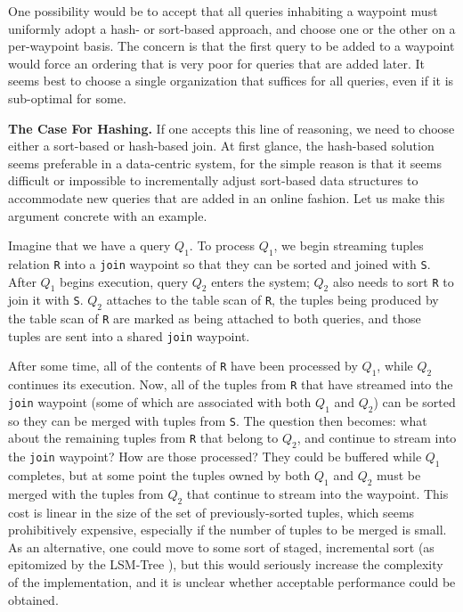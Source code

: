 \documentclass{sig-alternate}
\renewcommand\:{\colon} %
\begin{document}
One possibility would be to accept
that all queries inhabiting a waypoint must uniformly adopt a hash- or sort-based approach, and choose one or the other
on a per-waypoint basis.
The concern is that 
the first query to be added to a waypoint would force an ordering that is very poor for queries that 
are added later.  It seems best to choose a single organization that suffices for all queries, even if it is sub-optimal
for some.

\vspace{5 pt}
\noindent
\textbf{The Case For Hashing.}
If one accepts this line of reasoning, we need to choose either a sort-based or hash-based join. At
first glance, the hash-based solution seems 
preferable in a data-centric system, for the simple
reason is that it seems difficult or impossible to incrementally adjust sort-based data structures
to accommodate new queries that are added in an online fashion.
Let us make this argument concrete with an example.

Imagine that we have a query $Q_1$.  To process
$Q_1$, we begin streaming tuples relation \texttt{R} into a \texttt{join} waypoint so that they
can be sorted and 
joined with \texttt{S}.  After $Q_1$ begins execution,
query $Q_2$ enters the system; $Q_2$ also needs to sort \texttt{R} to join it with \texttt{S}.
$Q_2$ attaches to the table scan of \texttt{R}, the tuples being produced
by the table scan of \texttt{R} are marked as being attached to both queries, and those tuples are sent into a shared \texttt{join} waypoint.

After some time, all of the contents of \texttt{R} have been processed  
by $Q_1$, while $Q_2$ continues its execution.
Now, all of the tuples from \texttt{R} that have streamed into the \texttt{join} waypoint 
(some of which are associated with both $Q_1$ and $Q_2$) can be sorted
so they can be merged with tuples from \texttt{S}.  The question then becomes: what about the remaining tuples from \texttt{R}
that belong to $Q_2$, and continue to stream into the \texttt{join} waypoint? How are those processed?  
They could be buffered while $Q_1$ completes, but at some point the tuples
owned by both $Q_1$ and $Q_2$ must be merged with the tuples from $Q_2$ that continue to stream into
the waypoint.
This cost is linear in the size of the set of previously-sorted tuples, which seems prohibitively expensive, especially if the
number of tuples to be merged is small.
As an alternative,
one could move to some sort of staged, incremental sort (as epitomized by the LSM-Tree \cite{}),
but this would seriously
increase the complexity of the implementation, 
and it is unclear whether acceptable performance could be obtained.
\end{document}
